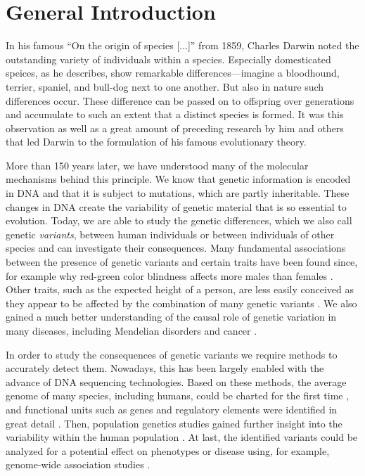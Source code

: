 \chapter{General Introduction}
\label{sec:intro}

In his famous ``On the origin of species [...]'' from 1859, Charles Darwin noted
the outstanding variety of individuals within a species. Especially domesticated
speices, as he describes, show remarkable differences---imagine a bloodhound,
terrier, spaniel, and bull-dog next to one another. But also in nature such
differences occur. These difference can be passed on to offspring over
generations and accumulate to such an extent that a distinct species is formed.
It was this observation as well as a great amount of preceding research by him
and others that led Darwin to the formulation of his famous evolutionary theory.

More than 150 years later, we have understood many of the molecular mechanisms
behind this principle. We know that genetic information is encoded in DNA and
that it is subject to mutations, which are partly inheritable. These changes in
DNA create the variability of genetic material that is so essential to
evolution. Today, we are able to study the genetic differences,
which we also call genetic \emph{variants},
between human individuals or between individuals of other species and can investigate
their consequences. Many fundamental associations between the presence of
genetic variants and certain traits have been found since, for example why
red-green color blindness affects more males than females \citep{Nathans1986}.
Other traits, such as the expected height of a person, are less easily conceived
as they appear to be affected by the combination of many genetic variants
\citep{Wood2014,Marouli2017}. We also gained a much better understanding of the
causal role of genetic variation in many diseases, including Mendelian disorders
and cancer \citep{Stankiewicz2010}.

In order to study the consequences of genetic variants we require
methods to accurately detect them. Nowadays, this has been largely enabled with
the advance of DNA sequencing technologies. Based on these methods, the average
genome of many species, including humans, could be charted for the first time
\citep{Lander2001,Venter2001}, and functional units such as genes and regulatory
elements were identified in great detail \citep{Dunham2012}. Then, population
genetics studies gained further insight into the variability within the human
population \citep{Auton2015,Sudmant2015}.
At last, the identified variants could be analyzed for a potential effect on
phenotypes or disease using, for example, genome-wide association studies
\citep{Ott2015,MacArthur2017}.

